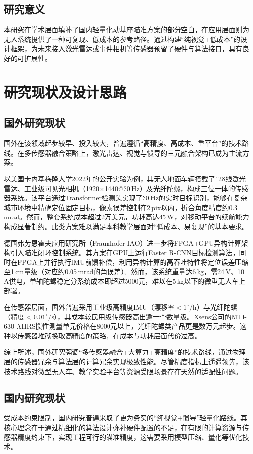 \subsection{研究意义}
本研究在学术层面填补了国内轻量化动基座瞄准方案的部分空白，在应用层面则为无人系统提供了一种可复现、低成本的参考路径。通过构建``纯视觉+低成本''的设计框架，为未来接入激光雷达或事件相机等传感器预留了硬件与算法接口，具有良好的可扩展性。

\section{研究现状及设计思路}

\subsection{国外研究现状}
国外在该领域起步较早、投入较大，普遍遵循``高精度、高成本、重平台''的技术路线。在多传感器融合策略上，激光雷达、视觉与惯导的三元融合架构已成为主流方案。

以美国卡内基梅隆大学2022年的公开实验为例，其无人地面车辆搭载了128线激光雷达、工业级可见光相机（1920×1440@30\,Hz）及光纤陀螺，构成三位一体的传感器系统。该平台通过Transformer检测头实现了30\,Hz的实时目标识别，能够在复杂城市环境中精确定位固定目标，像素误差控制在2\,pix以内，折合角度精度约0.3\,mrad。然而，整套系统成本超过2万美元，功耗高达45\,W，对移动平台的续航能力构成显著制约。此类方案难以满足本科教学层面对``低成本、易复现''的基本要求。

德国弗劳恩霍夫应用研究所（Fraunhofer IAO）进一步将FPGA+GPU异构计算架构引入瞄准闭环控制系统。其方案在GPU上运行Faster R-CNN目标检测算法，同时在FPGA上并行执行IMU前馈补偿，利用异构计算的高吞吐特性将定位误差压缩至1\,cm量级（对应约0.05\,mrad的角误差）。然而，该系统重量达6\,kg，需24\,V、10\,A供电，单轴陀螺稳定分系统成本即超过5000元，难以在5\,kg以下的微型无人车上部署。

在传感器层面，国外普遍采用工业级高精度IMU（漂移率$<1^\circ$/h）与光纤陀螺（精度$<0.01^\circ$/s），其成本较民用级传感器高出逾一个数量级。Xsens公司的MTi-630 AHRS惯性测量单元价格在8000元以上，光纤陀螺类产品更是数万元起步。这种以传感器堆砌换取高精度的策略，在成本与功耗层面代价过高。

综上所述，国外研究强调``多传感器融合+大算力+高精度''的技术路线，通过物理层的传感器冗余与算法层的计算冗余实现极致性能。尽管精度指标上遥遥领先\cite{Redmon2018YOLOv3}，该技术路线对微型无人车、教学实验平台等资源受限场景存在天然的适配性问题。
\subsection{国内研究现状}
受成本约束限制，国内研究普遍采取了更为务实的``纯视觉+惯导''轻量化路线\cite{Liu2018DeepLearning}。其核心理念在于通过精细化的算法设计弥补硬件配置的不足，在有限的计算资源与传感器精度约束下，实现工程可行的瞄准精度，这需要采用模型压缩、量化等优化技术\cite{Han2015DeepCompression}。

